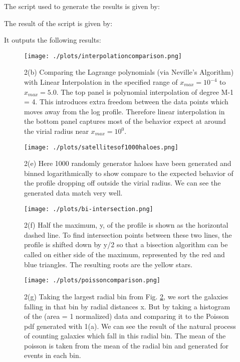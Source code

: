 
The script used to generate the results is given by:



The result of the script is given by:

It outputs the following results:



\begin{figure}[!htb]
  \centering
  \texttt{[image: ./plots/interpolationcomparison.png]}
  \caption{2(b) Comparing the Lagrange polynomials (via Neville's Algorithm) with Linear Interpolation in the specified range of $x_{max} = 10^{-4}$ to $x_{max} = 5.0$. The top panel is polynomial interpolation of degree M-1 = 4. This introduces extra freedom between the data points which moves away from the log profile. Therefore linear interpolation in the bottom panel captures most of the behavior expect at around the virial radius near $x_{max} = 10^{0}$. }
  \label{fig:interpcompare}
\end{figure}

\begin{figure}[!htb]
  \centering
  \texttt{[image: ./plots/satellitesof1000haloes.png]}
  \caption{2(e) Here 1000 randomly generator haloes have been generated and binned logarithmically to show compare to the expected behavior of the profile dropping off outside the virial radius. We can see the generated data match very well.}
  \label{fig:1000haloes}
\end{figure}


\begin{figure}[!htb]
  \centering
  \texttt{[image: ./plots/bi-intersection.png]}
  \caption{2(f) Half the maximum, y, of the profile is shown as the horizontal dashed line. To find intersection points between these two lines, the profile is shifted down by y/2 so that a bisection algorithm can be called on either side of the maximum, represented by the red and blue triangles. The resulting roots are the yellow stars.}
  \label{fig:intersection}
\end{figure}


\begin{figure}[!htb]
  \centering
  \texttt{[image: ./plots/poissoncomparison.png]}
  \caption{2(g) Taking the largest radial bin from Fig. \ref{fig:1000haloes}, we sort the galaxies falling in that bin by radial distances x. But by taking a histogram of the (area = 1 normalized) data and comparing it to the Poisson pdf generated with 1(a). We can see the result of the natural process of counting galaxies which fall in this radial bin. The mean of the poisson is taken from the mean of the radial bin and generated for events in each bin.}
  \label{fig:comppoisson}
\end{figure}



